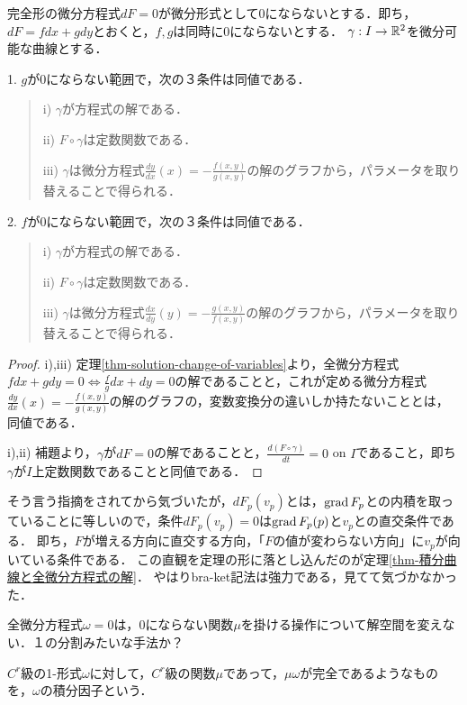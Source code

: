 \documentclass[uplatex,dvipdfmx]{jsreport}
\begin{document}
\begin{theorem}\label{thm-積分曲線と全微分方程式の解}
    完全形の微分方程式$dF=0$が微分形式として$0$にならないとする．即ち，$dF=fdx+gdy$とおくと，$f,g$は同時に$0$にならないとする．
    $\gamma:I\to\mathbb{R}^2$を微分可能な曲線とする．

    1. $g$が$0$にならない範囲で，次の３条件は同値である．
    \begin{quotation}
        i) $\gamma$が方程式の解である．

        ii) $F\circ\gamma$は定数関数である．

        iii) $\gamma$は微分方程式$\frac{dy}{dx}(x)=-\frac{f(x,y)}{g(x,y)}$の解のグラフから，パラメータを取り替えることで得られる．
    \end{quotation}

    2. $f$が$0$にならない範囲で，次の３条件は同値である．
    \begin{quotation}
        i) $\gamma$が方程式の解である．

        ii) $F\circ\gamma$は定数関数である．

        iii) $\gamma$は微分方程式$\frac{dx}{dy}(y)=-\frac{g(x,y)}{f(x,y)}$の解のグラフから，パラメータを取り替えることで得られる．
    \end{quotation}
\end{theorem}
\begin{proof}
    i),iii) 定理\ref{thm-solution-change-of-variables}より，全微分方程式$fdx+gdy=0\Leftrightarrow \frac{f}{g}dx+dy=0$の解であることと，これが定める微分方程式$\frac{dy}{dx}(x)=-\frac{f(x,y)}{g(x,y)}$の解のグラフの，変数変換分の違いしか持たないこととは，同値である．

    i),ii) 補題より，$\gamma$が$dF=0$の解であることと，$\frac{d(F\circ\gamma)}{dt}=0$ on $I$であること，即ち$\gamma$が$I$上定数関数であることと同値である．
\end{proof}

\begin{remark}
    そう言う指摘をされてから気づいたが，$dF_p(v_p)$とは，$\operatorname{\mathrm{grad}} F_p$との内積を取っていることに等しいので，条件$dF_p(v_p)=0$は$\operatorname{\mathrm{grad}} F_p(p)$と$v_p$との直交条件である．
    即ち，$F$が増える方向に直交する方向，「$F$の値が変わらない方向」に$v_p$が向いている条件である．
    この直観を定理の形に落とし込んだのが定理\ref{thm-積分曲線と全微分方程式の解}．
    やはりbra-ket記法は強力である，見てて気づかなかった．
\end{remark}

全微分方程式$\omega=0$は，$0$にならない関数$\mu$を掛ける操作について解空間を変えない．１の分割みたいな手法か？
\begin{definition}[積分因子]
    $C^r$級の1-形式$\omega$に対して，$C^r$級の関数$\mu$であって，$\mu\omega$が完全であるようなものを，$\omega$の積分因子という．
\end{definition}
\end{document}
